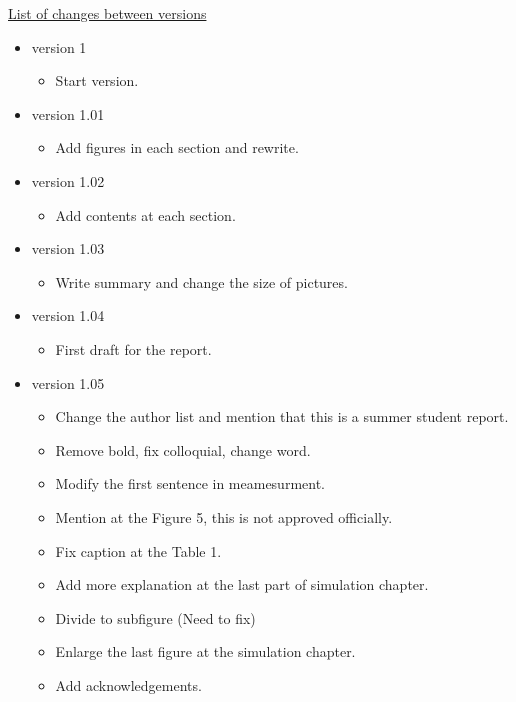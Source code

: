 \underline{List of changes between versions}

\begin{itemize}


\item version 1 
\begin{itemize}
\item Start version.
\end{itemize}

\item version 1.01
\begin{itemize}
\item Add figures in each section and rewrite.
\end{itemize}

\item version 1.02
\begin{itemize}
\item Add contents at each section.
\end{itemize}

\item version 1.03
\begin{itemize}
\item Write summary and change the size of pictures.
\end{itemize}

\item version 1.04
\begin{itemize}
\item First draft for the report.
\end{itemize}

\item version 1.05
\begin{itemize}
\item Change the author list and mention that this is a summer student report.
\item Remove bold, fix colloquial, change word.
\item Modify the first sentence in meamesurment. 
\item Mention at the Figure 5, this is not approved officially.
\item Fix caption at the Table 1.
\item Add more explanation at the last part of simulation chapter.
\item Divide to subfigure (Need to fix)
\item Enlarge the last figure at the simulation chapter.
\item Add acknowledgements.
\end{itemize}

\end{itemize}

\clearpage

